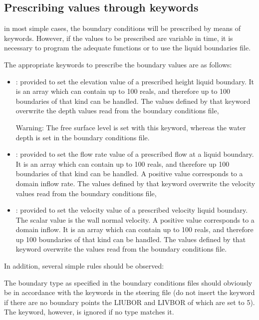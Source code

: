 \subsection{Prescribing values through keywords}

in most simple cases, the boundary conditions will be prescribed by means of
keywords. However, if the values to be prescribed are variable in time, it is
necessary to program the adequate functions or to use the liquid boundaries
file.

The appropriate keywords to prescribe the boundary values are as follows:

\begin{itemize}
\item {}: provided to set the
elevation value of a prescribed height liquid boundary. It is an array which
can contain up to 100 reals, and therefore up to 100 boundaries of that kind
can be handled. The values defined by that keyword overwrite the depth values
read from the boundary conditions file,

\begin{WarningBlock}{Warning:}
The free surface level is set with this keyword, whereas the water depth is set
in the boundary conditions file.
\end{WarningBlock}

\item {}: provided to set the flow rate value of a
prescribed flow at a liquid boundary. It is an array which can contain up to
100 reals, and therefore up 100 boundaries of that kind can be handled. A
positive value corresponds to a domain inflow rate. The values defined by that
keyword overwrite the velocity values read from the boundary conditions file,

\item {}: provided to set the velocity value of a
prescribed velocity liquid boundary. The scalar value is the wall normal
velocity. A positive value corresponds to a domain inflow. It is an array which
can contain up to 100 reals, and therefore up 100 boundaries of that kind can
be handled. The values defined by that keyword overwrite the values read from
the boundary conditions file.
\end{itemize}

In addition, several simple rules should be observed:

The boundary type as specified in the boundary conditions files should
obviously be in accordance with the keywords in the steering file (do not
insert the keyword  if there
are no boundary points the LIUBOR and LIVBOR of which are set to
5). The keyword, however, is ignored if no type matches it.


